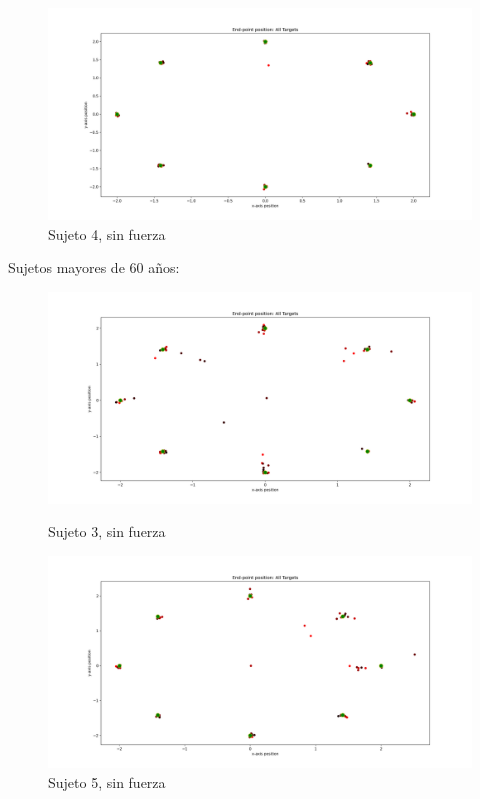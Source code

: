 \documentclass[a4paper,11pt, oneside]{book}
\begin{document}
\begin{figure}[h]
	\begin{minipage}[b]{0.5\linewidth}
		\centering
		\includegraphics[width=\linewidth]{sujeto4/no_force/trayectorias_puntos}
		\caption{Sujeto 4, sin fuerza}
		\label{fig:figura1}
	\end{minipage}
\end{figure}


Sujetos mayores de 60 años:
\\
\begin{figure}[h]
	\begin{minipage}[b]{0.5\linewidth}
		\centering
		\includegraphics[width=\linewidth]{sujeto3/no_force/trayectorias_puntos}
		\caption{Sujeto 3, sin fuerza}
		\label{fig:figura1}
	\end{minipage}
	\hspace{0.5cm}
	\begin{minipage}[b]{0.5\linewidth}
		\centering
		\includegraphics[width=\linewidth]{sujeto5/no_force/trayectorias_puntos}
		\caption{Sujeto 5, sin fuerza}
		\label{fig:figura2}
	\end{minipage}
\end{figure}
\end{document}
